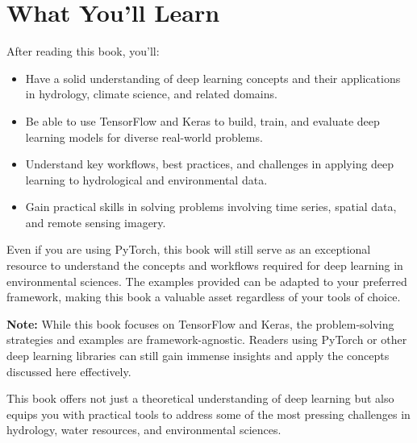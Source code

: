 \section*{What You'll Learn}
After reading this book, you’ll:
\begin{itemize}
    \item Have a solid understanding of deep learning concepts and their applications in hydrology, climate science, and related domains.
    \item Be able to use TensorFlow and Keras to build, train, and evaluate deep learning models for diverse real-world problems.
    \item Understand key workflows, best practices, and challenges in applying deep learning to hydrological and environmental data.
    \item Gain practical skills in solving problems involving time series, spatial data, and remote sensing imagery.
\end{itemize}

Even if you are using PyTorch, this book will still serve as an exceptional resource to understand the concepts and workflows required for deep learning in environmental sciences. The examples provided can be adapted to your preferred framework, making this book a valuable asset regardless of your tools of choice.

\begin{mdframed}[linewidth=1pt, linecolor=gray, backgroundcolor=gray!5]
\textbf{Note:} While this book focuses on TensorFlow and Keras, the problem-solving strategies and examples are framework-agnostic. Readers using PyTorch or other deep learning libraries can still gain immense insights and apply the concepts discussed here effectively.
\end{mdframed}

This book offers not just a theoretical understanding of deep learning but also equips you with practical tools to address some of the most pressing challenges in hydrology, water resources, and environmental sciences.
